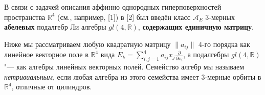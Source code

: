 



\vzmscaption

В связи с задачей описания аффинно однородных гиперповерхностей пространства $\mathbb{R}^4$ (см., например, [1]) в [2] был введён класс $\mathcal{A}_E$ 3-мерных \textbf{абелевых} подалгебр Ли алгебры $gl(4,\mathbb{R})$,  \textbf{содержащих единичную матрицу}.

Ниже мы рассматриваем любую квадратную матрицу $ \|a_{ij}\| $ 4-го порядка как линейное векторное поле в $\mathbb{R}^4 $ вида $E_k = \sum_{i,j =1 }^4 {a_{ij} x_j} \frac{\partial}{\partial x_i}$, а подалгебры $gl(4,\mathbb{R})$ "---  как алгебры линейных векторных полей. Семейство алгебр мы называем \textit{нетривиальным}, если любая алгебра из этого семейства имеет 3-мерные орбиты в $\mathbb{R}^4$, отличные от цилиндров.



